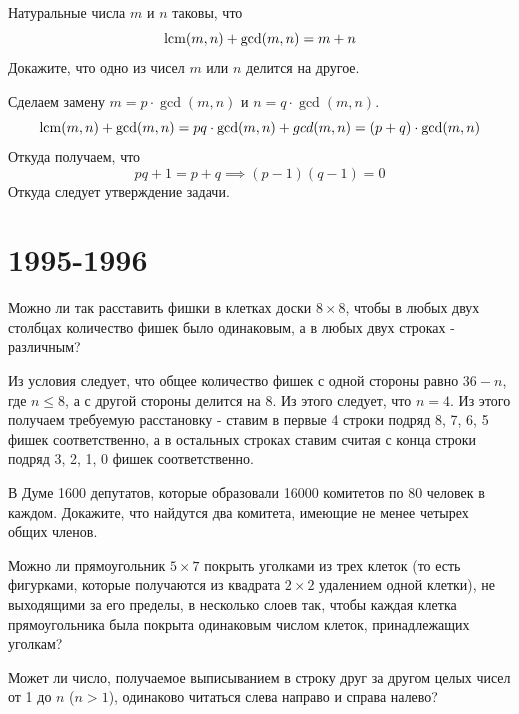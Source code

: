 \documentclass[11pt, a4paper]{common/document_template}
\begin{document}
\begin{exercise}
Натуральные числа $m$ и $n$ таковы, что
$$
\operatorname{lcm}(m, n) + \gcd(m, n) = m + n 
$$
Докажите, что одно из чисел $m$ или $n$ делится на другое.
\end{exercise}

\begin{Solution}
Сделаем замену $m = p \cdot \gcd(m, n)$ и $n = q \cdot \gcd(m, n)$. 
$$
\operatorname{lcm}(m, n) + \gcd(m, n) = pq \cdot \gcd(m, n) + gcd(m, n) = (p + q) \cdot \gcd(m, n)
$$
Откуда получаем, что
$$
pq + 1 = p + q \implies (p - 1)(q - 1) = 0
$$
Откуда следует утверждение задачи.
\end{Solution}

\chapter{1995-1996}

\begin{exercise}
Можно ли так расставить фишки в клетках доски $8 \times 8$, чтобы в любых двух столбцах количество фишек было одинаковым, а в любых двух строках - различным?
\end{exercise}

\begin{Solution}
Из условия следует, что общее количество фишек с одной стороны равно $36 - n$, где $n \leqslant 8$, а с другой стороны делится на 8. Из этого следует, что $n = 4$. Из этого получаем требуемую расстановку - ставим в первые 4 строки подряд 8, 7, 6, 5 фишек соответственно, а в остальных строках ставим считая с конца строки подряд 3, 2, 1, 0 фишек соответственно.
\end{Solution}

\begin{exercise}
В Думе 1600 депутатов, которые образовали 16000 комитетов по
80 человек в каждом. Докажите, что найдутся два комитета, имеющие не менее четырех общих членов.
\end{exercise}

\begin{exercise}
Можно ли прямоугольник $5 \times 7$ покрыть уголками из трех клеток
(то есть фигурками, которые получаются из квадрата $2 \times 2$ удалением одной клетки), не выходящими за его пределы, в несколько слоев так, чтобы каждая клетка прямоугольника была покрыта одинаковым числом клеток, принадлежащих уголкам?
\end{exercise}

\begin{exercise}
Может ли число, получаемое выписыванием в строку друг за другом целых чисел от 1 до $n$ ($n > 1$), одинаково читаться слева направо и справа налево?
\end{exercise}
\end{document}
